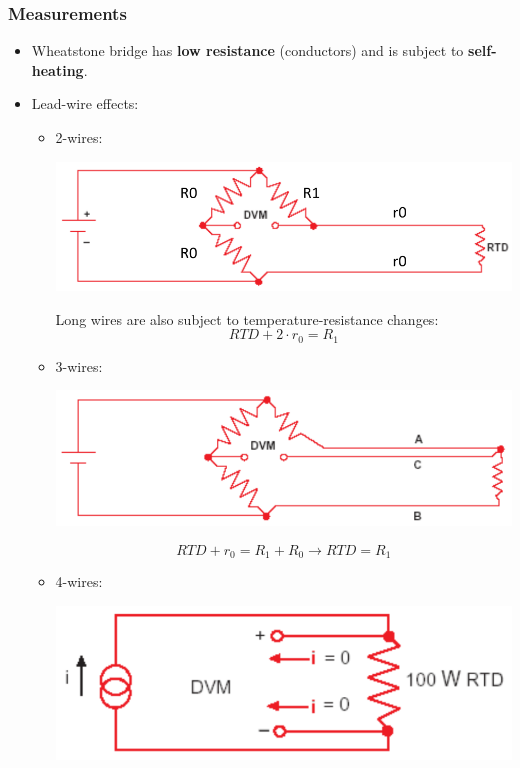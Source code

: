 \documentclass[11pt]{article}
\begin{document}
\subsubsection{Measurements}
\label{sec:org0a5cc92}
\begin{itemize}
\item Wheatstone bridge has \textbf{low resistance} (conductors) and is subject to \textbf{self-heating}.
\item Lead-wire effects:
\begin{itemize}
\item 2-wires:
\begin{center}
\includegraphics[width=.9\linewidth]{./images/2-wire-wheatstone-bridge-diagram.png}
\end{center}
Long wires are also subject to temperature-resistance changes:
\[RTD + 2 \cdot r_0 = R_1\]
\item 3-wires:
\begin{center}
\includegraphics[width=.9\linewidth]{./images/3-wire-wheatstone-bridge-diagram.png}
\end{center}
\[RTD + r_0 = R_1 + R_0 \rightarrow RTD = R_1\]
\item 4-wires:
\begin{center}
\includegraphics[width=.9\linewidth]{./images/4-wire-wheatstone-bridge-diagram.png}
\end{center}
\end{itemize}
\end{itemize}
\end{document}
